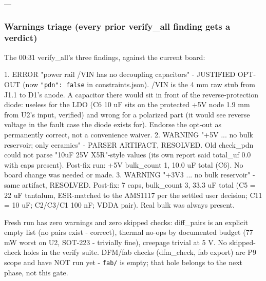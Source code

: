 \documentclass[11pt,a4paper]{article}
\begin{document}
---

\subsubsection*{Warnings triage (every prior verify\_all finding gets a verdict)}
The 00:31 verify\_all's three findings, against the current board:

1. ERROR "power rail /VIN has no decoupling capacitors" - JUSTIFIED OPT-OUT (now \texttt{"pdn": false} in constraints.json). /VIN is the 4 mm raw stub from J1.1 to D1's anode. A capacitor there would sit in front of the reverse-protection diode: useless for the LDO (C6 10 uF sits on the protected +5V node 1.9 mm from U2's input, verified) and wrong for a polarized part (it would see reverse voltage in the fault case the diode exists for). Endorse the opt-out as permanently correct, not a convenience waiver. 2. WARNING "+5V ... no bulk reservoir; only ceramics" - PARSER ARTIFACT, RESOLVED. Old check\_pdn could not parse "10uF 25V X5R"-style values (its own report said total\_uf 0.0 with caps present). Post-fix run: +5V bulk\_count 1, 10.0 uF total (C6). No board change was needed or made. 3. WARNING "+3V3 ... no bulk reservoir" - same artifact, RESOLVED. Post-fix: 7 caps, bulk\_count 3, 33.3 uF total (C5 = 22 uF tantalum, ESR-matched to the AMS1117 per the settled user decision; C11 = 10 uF; C2/C3/C1 100 nF; VDDA pair). Real bulk was always present.

Fresh run has zero warnings and zero skipped checks: diff\_pairs is an explicit empty list (no pairs exist - correct), thermal no-ops by documented budget (77 mW worst on U2, SOT-223 - trivially fine), creepage trivial at 5 V. No skipped-check holes in the verify suite. DFM/fab checks (dfm\_check, fab export) are P9 scope and have NOT run yet - \texttt{fab/} is empty; that hole belongs to the next phase, not this gate.
\end{document}
